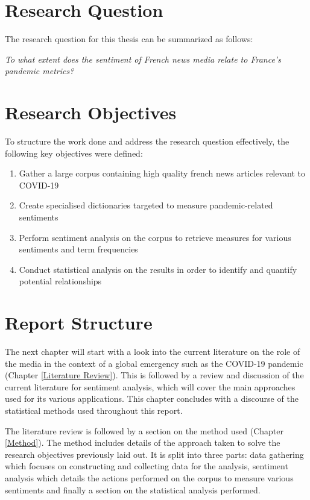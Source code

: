 \section{Research Question}\label{chap: Research Question}

The research question for this thesis can be summarized as follows:

\begin{center}
    \emph{To what extent does the sentiment of French news media relate to France's pandemic metrics?}
\end{center}

\section{Research Objectives}\label{chap: Research Objectives}
To structure the work done and address the research question effectively, the following key objectives were defined:
\begin{enumerate}
    \item Gather a large corpus containing high quality french news articles relevant to COVID-19
    \item Create specialised dictionaries targeted to measure pandemic-related sentiments
    \item Perform sentiment analysis on the corpus to retrieve measures for various sentiments and term frequencies
    \item Conduct statistical analysis on the results in order to identify and quantify potential relationships
\end{enumerate}

\section{Report Structure}\label{Report Structure}

The next chapter will start with a look into the current literature on the role of the media in the context of a global emergency such as the COVID-19 pandemic (Chapter \ref{Literature Review}). This is followed by a review and discussion of the current literature for sentiment analysis, which will cover the main approaches used for its various applications. This chapter concludes with a discourse of the statistical methods used throughout this report.

The literature review is followed by a section on the method used (Chapter \ref{Method}). The method includes details of the approach taken to solve the research objectives previously laid out. It is split into three parts: data gathering which focuses on constructing and collecting data for the analysis, sentiment analysis which details the actions performed on the corpus to measure various sentiments and finally a section on the statistical analysis performed.

